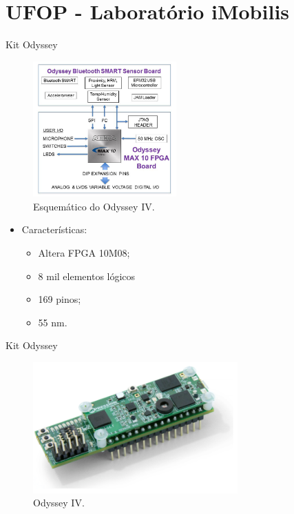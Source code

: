 \documentclass[aspectratio=169]{beamer}
\begin{document}
\section{UFOP - Laboratório iMobilis}
	\begin{frame}{Kit Odyssey}
		\begin{multicols}{2}
				\begin{figure}[h]
					\centering
					\includegraphics[width=0.49\textwidth]{img/imobilis/odyssey-esquematico.jpg}
					\caption{Esquemático do Odyssey IV.}
					\label{fig:odyssey-esquematico}
				\end{figure}
			\columnbreak
				\begin{itemize}
					\item Características:
					\begin{itemize}
						\setlength\itemsep{1em}
						\item Altera FPGA 10M08;
						\item 8 mil elementos lógicos
						\item 169 pinos;
						\item 55 nm.
					\end{itemize}
				\end{itemize}
		\end{multicols}
	\end{frame}
	
	\begin{frame}{Kit Odyssey}
		\begin{figure}[h]
			\centering
			\includegraphics[width=0.7\textwidth]{img/imobilis/odyssey-foto.png}
			\caption{Odyssey IV.}
			\label{fig:odyssey-foto}
		\end{figure}
	\end{frame}
	
\end{document}

